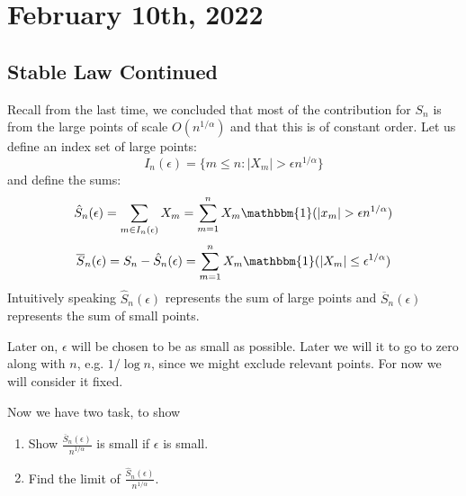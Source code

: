 \documentclass[../main/main.tex]{subfiles}
\begin{document}
\section{February 10th, 2022}
\subsection{Stable Law Continued}

Recall from the last time, we concluded that most of the contribution for $S_n$ is from the large points of scale $O(n^{1 / \alpha})$ and that this is of constant order. Let us define an index set of large points: \[
	I_n(\epsilon) = \{m \leq n: |X_m| > \epsilon n^{1 / \alpha}\}
\] and define the sums: \[
	\hat{S}_n(\epsilon) = \sum\limits_{m \in I_n(\epsilon)}X_m = \sum\limits_{m=1}^{n} X_m \mathbbm{1}(|x_m| > \epsilon n^{1 / \alpha})
\] \[
	\overline{S}_n(\epsilon) = S_n - \hat{S}_n(\epsilon) = \sum\limits_{m=1}^{n} X_m \mathbbm{1}(|X_m| \leq \epsilon ^{1 / \alpha})
\]
Intuitively speaking $\hat{S}_n(\epsilon)$ represents the sum of large points and $\overline{S}_n(\epsilon)$ represents the sum of small points.
\begin{remark}
	Later on, $\epsilon$ will be chosen to be as small as possible. Later we will it to go to zero along with $n$, e.g. $1 / \log n$, since we might exclude relevant points. For now we will consider it fixed.
\end{remark}
Now we have two task, to show
\begin{enumerate}
	\item Show $\frac{\overline{S}_n(\epsilon)}{n^{1 / \alpha}}$ is small if $\epsilon$ is small.
	\item Find the limit of $\frac{\hat{S}_n(\epsilon)}{n^{1 / \alpha}}$.
\end{enumerate}
\end{document}

